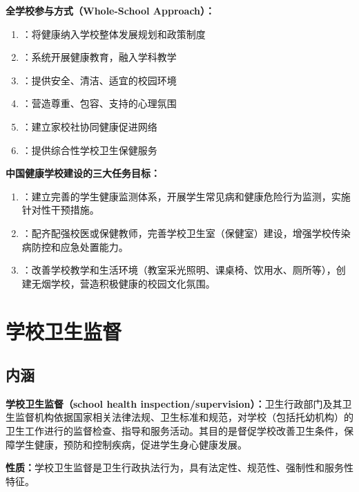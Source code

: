\begin{keybox}
\textbf{全学校参与方式（Whole-School Approach）：}
\begin{enumerate}[leftmargin=*]
    \item {}：将健康纳入学校整体发展规划和政策制度
    \item {}：系统开展健康教育，融入学科教学
    \item {}：提供安全、清洁、适宜的校园环境
    \item {}：营造尊重、包容、支持的心理氛围
    \item {}：建立家校社协同健康促进网络
    \item {}：提供综合性学校卫生保健服务
\end{enumerate}
\end{keybox}

\begin{defbox}
\textbf{中国健康学校建设的三大任务目标：}
\begin{enumerate}[leftmargin=*]
    \item {}：建立完善的学生健康监测体系，开展学生常见病和健康危险行为监测，实施针对性干预措施。
    \item {}：配齐配强校医或保健教师，完善学校卫生室（保健室）建设，增强学校传染病防控和应急处置能力。
    \item {}：改善学校教学和生活环境（教室采光照明、课桌椅、饮用水、厕所等），创建无烟学校，营造积极健康的校园文化氛围。
\end{enumerate}
\end{defbox}

\section{学校卫生监督}

\subsection{内涵}

\begin{defbox}
\textbf{学校卫生监督（school health inspection/supervision）：}卫生行政部门及其卫生监督机构依据国家相关法律法规、卫生标准和规范，对学校（包括托幼机构）的卫生工作进行的监督检查、指导和服务活动。其目的是督促学校改善卫生条件，保障学生健康，预防和控制疾病，促进学生身心健康发展。

\textbf{性质：}学校卫生监督是卫生行政执法行为，具有法定性、规范性、强制性和服务性特征。
\end{defbox}

